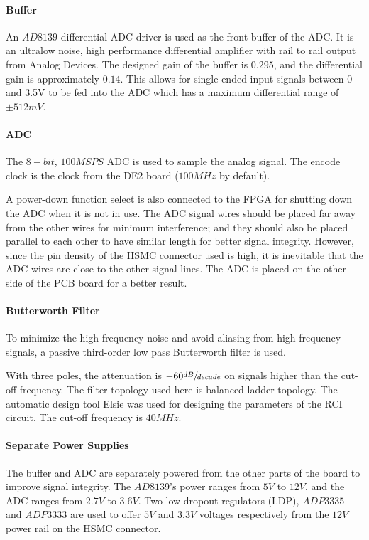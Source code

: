 \paragraph{Buffer}
An $AD8139$ differential ADC driver is used as the front buffer of the ADC.
It is an ultralow noise, high performance differential amplifier with rail to rail
output from Analog Devices. The designed gain of the buffer is $0.295$, and the differential gain is approximately $0.14$. This allows
for single-ended input signals between 0 and 3.5V to be fed into the ADC which has a maximum differential range of $\pm 512 mV$.

\paragraph{ADC}
The $8-bit$, $100MSPS$ ADC is used to sample the analog signal. The encode clock is
the clock from the DE2 board ($100MHz$ by default).

A power-down function select is also connected to the FPGA for shutting down the ADC when it is not in use.
The ADC signal wires should be placed far away from the other wires for minimum interference;
and they should also be placed parallel to each other to have similar length for better signal integrity.
However, since the pin density of the HSMC connector used is high, it is inevitable that the ADC wires
are close to the other signal lines. The ADC is placed on the other side of the PCB board for a better result.


\paragraph{Butterworth Filter}
To minimize the high frequency noise and avoid aliasing from high frequency signals, a passive third-order low pass Butterworth filter
is used.

With three poles, the attenuation is $-60 \sfrac{dB}{decade}$ on signals higher than the cut-off frequency.
The filter topology used here is balanced ladder topology.
The automatic design tool Elsie was used for designing the parameters of the RCI circuit. The cut-off frequency is $40MHz$.



\paragraph{Separate Power Supplies}
The buffer and ADC are separately powered from the other parts of the board to improve signal integrity.
The $AD8139$’s power ranges from $5V$ to $12V$, and the ADC ranges from $2.7V$ to $3.6V$.
Two low dropout regulators (LDP), $ADP3335$ and $ADP3333$ are used to offer $5V$ and $3.3V$ voltages respectively from the $12V$ power rail
on the HSMC connector.

